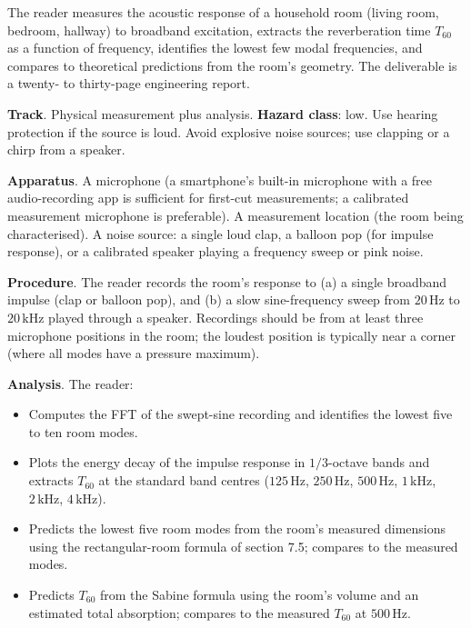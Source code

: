 \begin{project}
The reader measures the acoustic response of a household room
(living room, bedroom, hallway) to broadband excitation, extracts
the reverberation time $T_{60}$ as a function of frequency,
identifies the lowest few modal frequencies, and compares to
theoretical predictions from the room's geometry. The deliverable is
a twenty- to thirty-page engineering report.

\textbf{Track}. Physical measurement plus analysis. \textbf{Hazard
class}: low. Use hearing protection if the source is loud. Avoid
explosive noise sources; use clapping or a chirp from a speaker.

\textbf{Apparatus}. A microphone (a smartphone's built-in microphone
with a free audio-recording app is sufficient for first-cut measurements;
a calibrated measurement microphone is preferable). A measurement
location (the room being characterised). A noise source: a single
loud clap, a balloon pop (for impulse response), or a calibrated
speaker playing a frequency sweep or pink noise.

\textbf{Procedure}. The reader records the room's response to (a)
a single broadband impulse (clap or balloon pop), and (b) a slow
sine-frequency sweep from $20\,\si{\hertz}$ to $20\,\si{\kilo\hertz}$
played through a speaker. Recordings should be from at least three
microphone positions in the room; the loudest position is typically
near a corner (where all modes have a pressure maximum).

\textbf{Analysis}. The reader:

\begin{itemize}[leftmargin=*]
  \item Computes the FFT of the swept-sine recording and identifies
    the lowest five to ten room modes.
  \item Plots the energy decay of the impulse response in $1/3$-octave
    bands and extracts $T_{60}$ at the standard band centres
    ($125\,\si{\hertz}$, $250\,\si{\hertz}$, $500\,\si{\hertz}$,
    $1\,\si{\kilo\hertz}$, $2\,\si{\kilo\hertz}$, $4\,\si{\kilo\hertz}$).
  \item Predicts the lowest five room modes from the room's
    measured dimensions using the rectangular-room formula of
    section 7.5; compares to the measured modes.
  \item Predicts $T_{60}$ from the Sabine formula using the room's
    volume and an estimated total absorption; compares to the
    measured $T_{60}$ at $500\,\si{\hertz}$.
\end{itemize}


\end{project}
